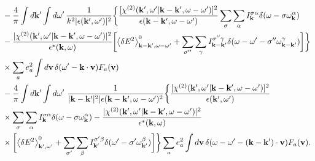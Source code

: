 \documentclass[10pt,aspectratio=1610,lualatex]{beamer}
\begin{document}
\begin{frame}[noframenumbering]
  \begin{displaymath}
    \begin{split}
      &-\frac{4}{\pi}\int d{\bf k '} \int d\omega '\,
      \frac{1}{k^2|\epsilon({\bf k'},\omega ')|^2}\biggl\{
      \frac{[\chi^{(2)}({\bf k'},\omega '|{\bf k-k'},\omega
	-\omega ')]^2}{\epsilon({\bf k - k'},\omega-\omega ')}
      \sum_{\sigma}\sum_{\alpha}I_{\bf k}^{\sigma \alpha}
      \delta(\omega-\sigma \omega_{\bf k}^\alpha)\\
      &-\frac{|\chi^{(2)}({\bf k'},\omega '|{\bf k-k'},\omega-\omega ')|^2}
      {\epsilon^*({\bf k},\omega)}\biggl[
      \left< \delta E^2 \right>_{{\bf k - k'},\omega-\omega '}^0
      +\sum_{\sigma ''}\sum_{\gamma}I_{\bf k -k'}^{\sigma '' \gamma}
      \delta(\omega-\omega ' -\sigma '' \omega_{\bf k -k'}^\gamma)
      \biggr]\biggr\}\\
      &\times\sum_ae_a^2\int d{\bf v}\,
      \delta(\omega '-{\bf k \cdot v})F_a({\bf v})\\
      &-\frac{4}{\pi}\int d{\bf k '} \int d\omega '\
      \frac{1}{|{\bf k - k'}|^2|\epsilon({\bf k-k'},\omega-\omega ')^2}
      \biggl\{ \frac{[\chi^{(2)}({\bf k'},\omega '|{\bf k-k'},\omega
	-\omega ')]^2}{\epsilon({\bf k'},\omega ')}\\
      &\times\sum_{\sigma}\sum_{\alpha} I_{\bf k}^{\sigma \alpha}
      \delta(\omega-\sigma \omega_{\bf k}^\alpha)
      -\frac{|\chi^{(2)}({\bf k'},\omega '|{\bf k-k'},\omega-\omega ')|^2}
      {\epsilon^*({\bf k},\omega)}\\
      &\times \biggl[\left< \delta E^2 \right>_{{\bf k'},\omega '}^0
      +\sum_{\sigma '}\sum_{\beta}I_{\bf k'}^{\sigma ' \beta}
      \delta(\omega '-\sigma ' \omega_{\bf k'}^\beta)\biggr]\biggr\}
      \sum_a e_a^2\int d{\bf v}\,
      \delta(\omega-\omega '-{\bf (k-k')\cdot v})F_a({\bf v}).
    \end{split}
  \end{displaymath}
\end{frame}
\end{document}
